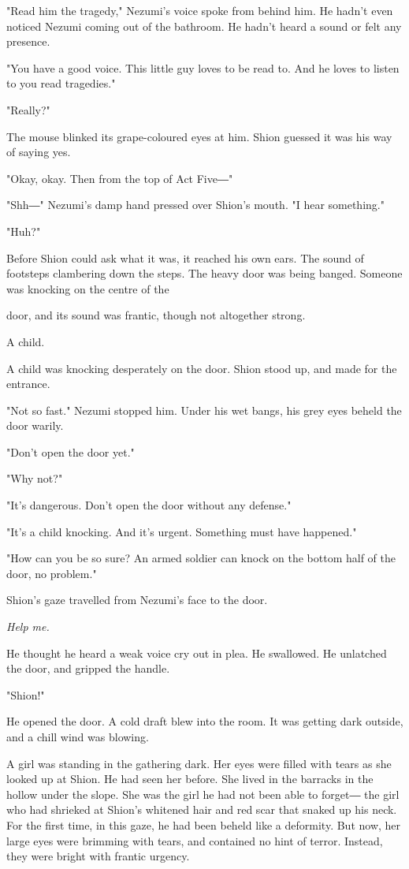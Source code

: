 "Read him the tragedy," Nezumi's voice spoke from behind him. He hadn't
even noticed Nezumi coming out of the bathroom. He hadn't heard a sound
or felt any presence.

"You have a good voice. This little guy loves to be read to. And he
loves to listen to you read tragedies."

"Really?"

The mouse blinked its grape-coloured eyes at him. Shion guessed it was
his way of saying yes.

"Okay, okay. Then from the top of Act Five―"

"Shh―" Nezumi's damp hand pressed over Shion's mouth. "I hear
something."

"Huh?"

Before Shion could ask what it was, it reached his own ears. The sound
of footsteps clambering down the steps. The heavy door was being banged.
Someone was knocking on the centre of the~

door, and its sound was frantic, though not altogether strong.

A child.

A child was knocking desperately on the door. Shion stood up, and made
for the entrance.

"Not so fast." Nezumi stopped him. Under his wet bangs, his grey eyes
beheld the door warily.

"Don't open the door yet."

"Why not?"

"It's dangerous. Don't open the door without any defense."

"It's a child knocking. And it's urgent. Something must have happened."

"How can you be so sure? An armed soldier can knock on the bottom half
of the door, no problem."

Shion's gaze travelled from Nezumi's face to the door.

\emph{Help me.}

He thought he heard a weak voice cry out in plea. He swallowed. He
unlatched the door, and gripped the handle.

"Shion!"

He opened the door. A cold draft blew into the room. It was getting dark
outside, and a chill wind was blowing.

A girl was standing in the gathering dark. Her eyes were filled with
tears as she looked up at Shion. He had seen her before. She lived in
the barracks in the hollow under the slope. She was the girl he had not
been able to forget― the girl who had shrieked at Shion's whitened hair
and red scar that snaked up his neck. For the first time, in this gaze,
he had been beheld like a deformity. But now, her large eyes were
brimming with tears, and contained no hint of terror. Instead, they were
bright with frantic urgency.~


